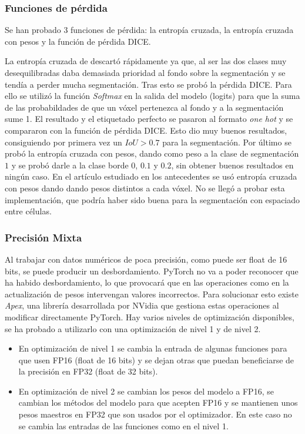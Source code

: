 \subsubsection{Funciones de pérdida}
Se han probado 3 funciones de pérdida: la entropía cruzada, la entropía cruzada con pesos y la función de pérdida DICE.

La entropía cruzada de descartó rápidamente ya que, al ser las dos clases muy desequilibradas daba demasiada prioridad al fondo sobre la segmentación y se tendía a perder mucha segmentación. 
Tras esto se probó la pérdida DICE. Para ello se utilizó la función \textit{Softmax} en la salida del modelo (logits) para que la suma de las probabildades de que un vóxel pertenezca al fondo y a la segmentación sume 1. El resultado y el etiquetado perfecto se pasaron al formato \textit{one hot} y se compararon con la función de pérdida DICE. Esto dio muy buenos resultados, consiguiendo por primera vez un $IoU>0.7$ para la segmentación.
Por último se probó la entropía cruzada con pesos, dando como peso a la clase de segmentación $1$ y se probó darle a la clase borde $0$, $0.1$ y $0.2$, sin obtener buenos resultados en ningún caso. En el artículo estudiado en los antecedentes \cite{Falk2019} se usó entropía cruzada con pesos dando dando pesos distintos a cada vóxel. No se llegó a probar esta implementación, que podría haber sido buena para la segmentación con espaciado entre células.

\subsubsection{Precisión Mixta}

Al trabajar con datos numéricos de poca precisión, como puede ser float de 16 bits, se puede producir un desbordamiento. PyTorch no va a poder reconocer que ha habido desbordamiento, lo que provocará que en las operaciones como en la actualización de pesos intervengan valores incorrectos. Para solucionar esto existe \textit{Apex}, una librería desarrollada por NVidia que gestiona estas operaciones al modificar directamente PyTorch. Hay varios niveles de optimización disponibles, se ha probado a utilizarlo con una optimización de nivel 1 y de nivel 2.
\begin{itemize}
\item En optimización de nivel 1 se cambia la entrada de algunas funciones para que usen FP16 (float de 16 bits) y se dejan otras que puedan beneficiarse de la precisión en FP32 (float de 32 bits).
\item En optimización de nivel 2 se cambian los pesos del modelo a FP16, se cambian los métodos del modelo para que acepten FP16 y se mantienen unos pesos maestros en FP32 que son usados por el optimizador. En este caso no se cambia las entradas de las funciones como en el nivel 1.
\end{itemize}

